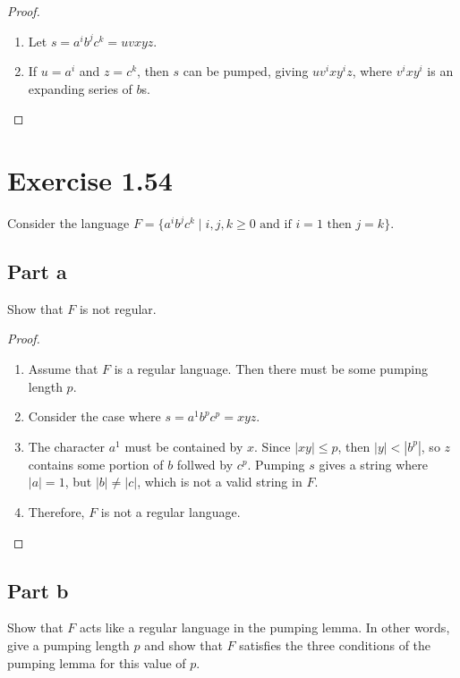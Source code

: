 \documentclass{article}
\newcommand{\where}{\mid}
\begin{document}
\begin{proof}
	\mbox{}
	\begin{enumerate}
	  \item Let $s = a^i b^j c^k = uvxyz$.
	  \item If $u = a^i$ and $z = c^k$, then $s$ can be pumped, giving $uv^ixy^iz$,
	  where $v^ixy^i$ is an expanding series of $b$s. \qedhere
	\end{enumerate}
\end{proof}

\section{Exercise 1.54}

Consider the language $F = \{a^i b^j c^k \where i, j, k \geq 0 \text{ and if }
i = 1 \text{ then } j = k\}$. 

\subsection{Part a}
Show that $F$ is not regular.

\begin{proof}
	\mbox{}
	\begin{enumerate}
	  \item Assume that $F$ is a regular language. Then there must be some pumping
	  length $p$.
	  \item Consider the case where $s = a^1 b^p c^p = xyz$. 
	  \item The character $a^1$ must be contained by $x$. Since $|xy| \leq p$, then
	  $|y| < |b^p|$, so $z$ contains some portion of $b$ follwed by $c^p$. Pumping
	  $s$ gives a string where $|a| = 1$, but $|b| \neq |c|$, which is not a valid
	  string in $F$.
	  \item Therefore, $F$ is not a regular language. \qedhere
	\end{enumerate}
\end{proof}

\subsection{Part b}

Show that $F$ acts like a regular language in the pumping lemma. In other words,
give a pumping length $p$ and show that $F$ satisfies the three conditions of
the pumping lemma for this value of $p$.
\end{document}
